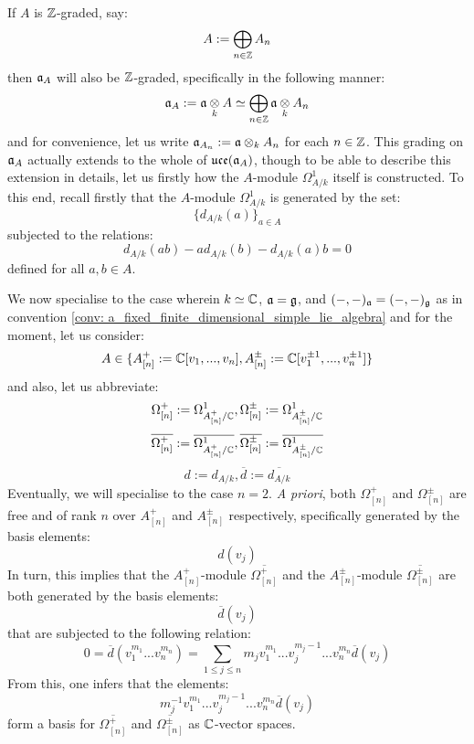 \begin{remark}
                If $A$ is $\mathbb{Z}$-graded, say:
                    $$A := \bigoplus_{n \in \mathbb{Z}} A_n$$
                then $\mathfrak{a}_A$ will also be $\mathbb{Z}$-graded, specifically in the following manner:
                    $$\a_A := \a \tensor_k A \cong \bigoplus_{n \in \Z} \a \tensor_k A_n$$
                and for convenience, let us write $\a_{A_n} := \a \tensor_k A_n$ for each $n \in \mathbb{Z}$. This grading on $\mathfrak{a}_A$ actually extends to the whole of $\mathfrak{uce}(\mathfrak{a}_A)$, though to be able to describe this extension in details, let us firstly how the $A$-module $\Omega^1_{A/k}$ itself is constructed. To this end, recall firstly that the $A$-module $\Omega^1_{A/k}$ is generated by the set:
                    $$\{d_{A/k}(a)\}_{a \in A}$$
                subjected to the relations:
                    $$d_{A/k}(ab) - a d_{A/k}(b) - d_{A/k}(a) b = 0$$
                defined for all $a, b \in A$. 

                We now specialise to the case wherein $k \simeq \mathbb{C}$, $\mathfrak{a} = \mathfrak{g}$, and $(-, -)_{\mathfrak{a}} = (-, -)_{\mathfrak{g}}$ as in convention \ref{conv: a_fixed_finite_dimensional_simple_lie_algebra} and for the moment, let us consider:
                    $$A \in \{ A_{[n]}^+ := \mathbb{C}[v_1, ..., v_n], A_{[n]}^{\pm} := \mathbb{C}[v_1^{\pm 1}, ..., v_n^{\pm 1}] \}$$
                and also, let us abbreviate:
                    $$\Omega^+_{[n]} := \Omega^1_{A_{[n]}^+/\mathbb{C}}, \Omega^{\pm}_{[n]} := \Omega^1_{A_{[n]}^{\pm}/\mathbb{C}}$$
                    $$\overline{\Omega^+_{[n]}} := \overline{\Omega^1_{A_{[n]}^+/\mathbb{C}}}, \overline{\Omega^{\pm}_{[n]}} := \overline{\Omega^1_{A_{[n]}^{\pm}/\mathbb{C}}}$$
                    $$d := d_{A/k}, \overline{d} := \overline{d_{A/k}}$$
                Eventually, we will specialise to the case $n = 2$. \textit{A priori}, both $\Omega^+_{[n]}$ and $\Omega^{\pm}_{[n]}$ are free and of rank $n$ over $A_{[n]}^+$ and $A_{[n]}^{\pm}$ respectively, specifically generated by the basis elements:
                    $$d(v_j)$$
                In turn, this implies that the $A_{[n]}^+$-module $\overline{\Omega^+_{[n]}}$ and the $A_{[n]}^{\pm}$-module $\overline{\Omega^{\pm}_{[n]}}$ are both generated by the basis elements:
                    $$\overline{d}(v_j)$$
                that are subjected to the following relation:
                    $$0 = \overline{d}( v_1^{m_1} ... v_n^{m_n} ) = \sum_{1 \leq j \leq n} m_j v_1^{m_1} ... v_j^{m_j - 1} ... v_n^{m_n} \overline{d}(v_j)$$
                From this, one infers that the elements:
                    $$m_j^{-1} v_1^{m_1} ... v_j^{m_j - 1} ... v_n^{m_n} \overline{d}(v_j)$$
                form a basis for $\overline{\Omega^+_{[n]}}$ and $\overline{\Omega^{\pm}_{[n]}}$ as $\mathbb{C}$-vector spaces. 


\end{remark}
